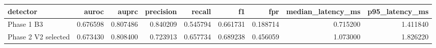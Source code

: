 \begin{tabular}{lrrrrrrrr}
\toprule
detector & auroc & auprc & precision & recall & f1 & fpr & median_latency_ms & p95_latency_ms \\
\midrule
Phase 1 B3 & 0.676598 & 0.807486 & 0.840209 & 0.545794 & 0.661731 & 0.188714 & 0.715200 & 1.411840 \\
Phase 2 V2 selected & 0.673430 & 0.808400 & 0.723913 & 0.657734 & 0.689238 & 0.456059 & 1.073000 & 1.826220 \\
\bottomrule
\end{tabular}
